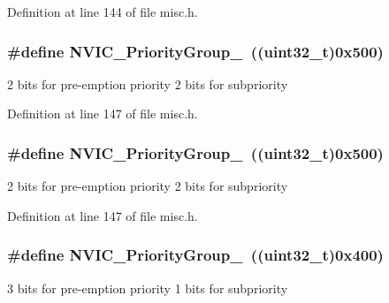 Definition at line 144 of file misc.\+h.

\subsubsection[{\texorpdfstring{N\+V\+I\+C\+\_\+\+Priority\+Group\+\_\+2}{NVIC_PriorityGroup_2}}]{\setlength{\rightskip}{0pt plus 5cm}\#define N\+V\+I\+C\+\_\+\+Priority\+Group\+\_~(({\bf uint32\+\_\+t})0x500)}\hypertarget{group___preemption___priority___group_ga505002e8b76aef65499ca371e40ec8b4}{}\label{group___preemption___priority___group_ga505002e8b76aef65499ca371e40ec8b4}
2 bits for pre-\/emption priority 2 bits for subpriority 

Definition at line 147 of file misc.\+h.

\subsubsection[{\texorpdfstring{N\+V\+I\+C\+\_\+\+Priority\+Group\+\_\+2}{NVIC_PriorityGroup_2}}]{\setlength{\rightskip}{0pt plus 5cm}\#define N\+V\+I\+C\+\_\+\+Priority\+Group\+\_~(({\bf uint32\+\_\+t})0x500)}\hypertarget{group___preemption___priority___group_ga505002e8b76aef65499ca371e40ec8b4}{}\label{group___preemption___priority___group_ga505002e8b76aef65499ca371e40ec8b4}
2 bits for pre-\/emption priority 2 bits for subpriority 

Definition at line 147 of file misc.\+h.

\subsubsection[{\texorpdfstring{N\+V\+I\+C\+\_\+\+Priority\+Group\+\_\+3}{NVIC_PriorityGroup_3}}]{\setlength{\rightskip}{0pt plus 5cm}\#define N\+V\+I\+C\+\_\+\+Priority\+Group\+\_~(({\bf uint32\+\_\+t})0x400)}\hypertarget{group___preemption___priority___group_ga49bdbee77d4a70339d63c80462d49b4d}{}\label{group___preemption___priority___group_ga49bdbee77d4a70339d63c80462d49b4d}
3 bits for pre-\/emption priority 1 bits for subpriority 

